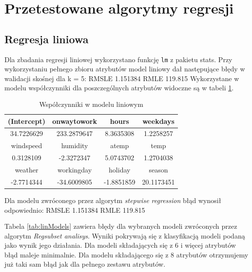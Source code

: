 \documentclass[a4paper,12pt]{article}
\begin{document}
    
\section{Przetestowane algorytmy regresji}

   \subsection{Regresja liniowa}
       Dla zbadania regresji liniowej wykorzystano funkcję \texttt{lm} z pakietu {stats}.
       Przy wykorzystaniu pełnego zbioru atrybutów model liniowy dał następujące błędy w walidacji skośnej dla k = 5:
       RMSLE 1.151384
       RMLE 119.815
        Wykorzystane w modelu współczynniki dla poszczególnych atrybutów widoczne są w tabeli \ref{tab:wspolczynnikiLin}.
        
            \begin{table}
            	\centering
            	\begin{tabular}{|c|c|c|c|}
            	\hline 
            	(Intercept) & onwaytowork & hours & weekdays \\ 
            	\hline 
            	34.7226629 & 233.2879647 & 8.3635308 & 1.2258257 \\ 
            	\hline 
            	windspeed & humidity & atemp & temp \\ 
            	\hline 
            	0.3128109 & -2.3272347 & 5.0743702 & 1.2704038 \\ 
            	\hline 
            	weather & workingday & holiday & season \\ 
            	\hline 
            	-2.7714344 & -34.6009805 & -1.8851859 & 20.1173451 \\ 
            	\hline 
            	\end{tabular} 
                \caption{Współczynniki w modelu liniowym}
                \label{tab:wspolczynnikiLin}
        \end{table}  
        
        Dla modelu zwróconego przez algorytm \textit{stepwise regression} błąd wynosił odpowiednio:
        RMSLE 1.151384
        RMLE 119.815
        
        Tabela \ref{tab:linModels} zawiera błędy dla wybranych modeli zwróconych przez algorytm \textit{Regsubset analisys}. Wyniki pokrywają się z klasyfikacją modeli podaną jako wynik jego działania. Dla modeli składających się z 6 i więcej atrybutów błąd maleje minimalnie. Dla modelu składającego się z 8 atrybutów otrzymujemy już taki sam błąd jak dla pełnego zestawu atrybutów.
        
\end{document}

